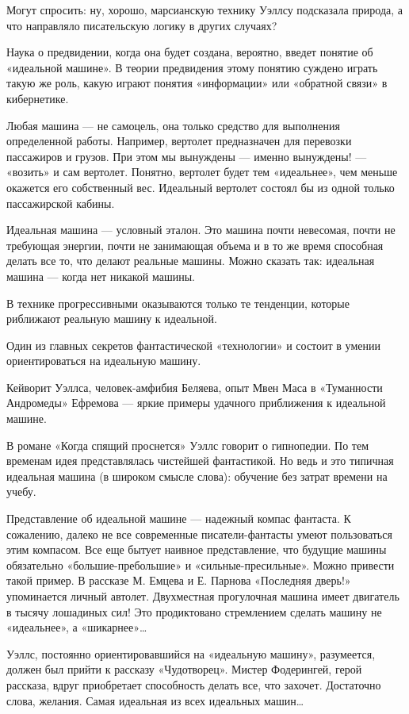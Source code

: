 Могут спросить: ну, хорошо, марсианскую технику Уэллсу подсказала природа,
а что направляло писательскую логику в других случаях?

Наука о предвидении, когда она будет создана, вероятно, введет понятие  об
«идеальной машине».  В теории  предвидения  этому понятию  суждено  играть
такую же роль, какую  играют понятия «информации»  или «обратной связи»  в
кибернетике.

Любая  машина  —   не  самоцель,  она   только  средство  для   выполнения
определенной  работы.  Например,   вертолет  предназначен  для   перевозки
пассажиров и грузов. При этом мы вынуждены — именно вынуждены! —  «возить»
и сам  вертолет.  Понятно,  вертолет будет  тем  «идеальнее»,  чем  меньше
окажется его  собственный  вес. Идеальный  вертолет  состоял бы  из  одной
только пассажирской кабины.

Идеальная машина — условный эталон.  Это машина почти невесомая, почти  не
требующая энергии, почти не  занимающая объема и в  то же время  способная
делать все то, что  делают реальные машины.  Можно сказать так:  идеальная
машина — когда нет никакой машины.

В  технике  прогрессивными  оказываются   только  те  тенденции,   которые
риближают реальную машину к идеальной.

Один из главных  секретов фантастической «технологии»  и состоит в  умении
ориентироваться на идеальную машину.

Кейворит Уэллса,  человек-амфибия Беляева,  опыт Мвен  Маса в  «Туманности
Андромеды» Ефремова  —  яркие  примеры удачного  приближения  к  идеальной
машине.

В романе  «Когда спящий  проснется»  Уэллс говорит  о гипнопедии.  По  тем
временам идея представлялась чистейшей фантастикой. Но ведь и это типичная
идеальная машина (в широком смысле слова): обучение без затрат времени  на
учебу.

Представление об идеальной машине — надежный компас фантаста. К сожалению,
далеко  не  все  современные  писатели-фантасты  умеют  пользоваться  этим
компасом.  Все  еще  бытует  наивное  представление,  что  будущие  машины
обязательно «большие-пребольшие»  и «сильные-пресильные».  Можно  привести
такой пример.  В  рассказе  М.  Емцева и  Е.  Парнова  «Последняя  дверь!»
упоминается личный автолет. Двухместная прогулочная машина имеет двигатель
в тысячу лошадиных  сил! Это  продиктовано стремлением  сделать машину  не
«идеальнее», а «шикарнее»…

Уэллс, постоянно  ориентировавшийся  на  «идеальную  машину»,  разумеется,
должен был  прийти  к  рассказу  «Чудотворец».  Мистер  Фодерингей,  герой
рассказа,  вдруг  приобретает   способность  делать   все,  что   захочет.
Достаточно слова, желания. Самая идеальная из всех идеальных машин…

